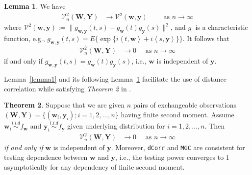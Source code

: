 \documentclass[12pt]{article}
\theoremstyle{definition}
\newtheorem{theorem}{Theorem}[section]
\newtheorem{lemma}[theorem]{Lemma}
\begin{document}
\begin{lemma}
	\label{lemma2}
We have 
	\begin{eqnarray}
		\mathcal{V}_{n}^{2}(\mathbf{W},\mathbf{Y}) &\longrightarrow \mathcal{V}^{2}(\mathbf{w},\mathbf{y}) \quad \quad \mbox{ as } n \rightarrow \infty
	\label{eq:conv1}
	\end{eqnarray}
where $\mathcal{V}^{2} (\mathbf{w},\mathbf{y}) := \| g_{\mathbf{w},\mathbf{y}}(t,s) - g_{\mathbf{w}}(t) g_{\mathbf{y}}(s) \|^2$, and $g_{\cdot}$ is a characteristic function, e.g., $g_{\mathbf{w},\mathbf{y}}(t,s) = E\{\exp\{i \left\langle t,\mathbf{w} \right\rangle  +i \left\langle  s,\mathbf{y}\right\rangle \}\}$.
	It follows that 
	\begin{eqnarray}
		\mathcal{V}_{n}^{2}(\mathbf{W},\mathbf{Y}) &\rightarrow 0 \quad \mbox{ as } n \rightarrow \infty
		\label{eq:conv2}
	\end{eqnarray}
	if and only if $g_{\mathbf{w},\mathbf{y}}(t,s) = g_{\mathbf{w}}(t) g_{\mathbf{y}}(s)$, i.e., $\mathbf{w}$ is independent of $\mathbf{y}$.
\end{lemma}
Lemma~\ref{lemma1} and its following Lemma~\ref{lemma2} facilitate the use of distance correlation while satisfying \textit{Theorem 2} in \cite{szekely2007measuring}.  

\begin{theorem}
	Suppose that we are given $n$ pairs of exchangeable observations $(\mathbf{W}, \mathbf{Y}) = \{  (\mathbf{w}_{i}, \mathbf{y}_{i} ) ; i = 1,2, \ldots, n \}$ having finite second moment. Assume $\mathbf{w}_{i} \overset{i.i.d}{\sim} f_{\mathbf{w}}$ and $\mathbf{y}_{i} \overset{i.i.d}{\sim} f_{\mathbf{y}}$ given underlying distribution for $i = 1,2, \ldots, n$. Then
	\begin{eqnarray}
		\mathcal{V}_{n}^{2}(\mathbf{W},\mathbf{Y}) &\longrightarrow 0 \quad \mbox{ as } n \rightarrow \infty
	\end{eqnarray}	
	\textit{if and only if} $\mathbf{w}$ is independent of $\mathbf{y}$. Moreover, \texttt{dCorr} and \texttt{MGC} are consistent for testing dependence between $\mathbf{w}$ and $\mathbf{y}$, i.e., the testing power converges to $1$ asymptotically for any dependency of finite second moment.
	\label{theoremMain}
\end{theorem}
\end{document}
